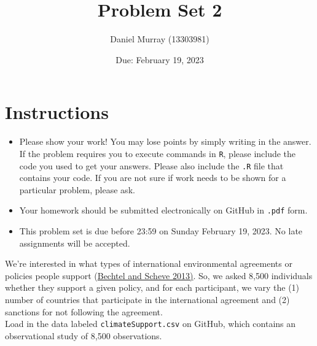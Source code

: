 \documentclass[12pt,letterpaper]{article}
\title{Problem Set 2}
\date{Due: February 19, 2023}
\author{Daniel Murray (13303981)}
\begin{document}
	\maketitle
	\section*{Instructions}
	\begin{itemize}
		\item Please show your work! You may lose points by simply writing in the answer. If the problem requires you to execute commands in \texttt{R}, please include the code you used to get your answers. Please also include the \texttt{.R} file that contains your code. If you are not sure if work needs to be shown for a particular problem, please ask.
		\item Your homework should be submitted electronically on GitHub in \texttt{.pdf} form.
		\item This problem set is due before 23:59 on Sunday February 19, 2023. No late assignments will be accepted.
	\end{itemize}

	
	

	\vspace{.25cm}
\noindent We're interested in what types of international environmental agreements or policies people support (\href{https://www.pnas.org/content/110/34/13763}{Bechtel and Scheve 2013)}. So, we asked 8,500 individuals whether they support a given policy, and for each participant, we vary the (1) number of countries that participate in the international agreement and (2) sanctions for not following the agreement. \\

\noindent Load in the data labeled \texttt{climateSupport.csv} on GitHub, which contains an observational study of 8,500 observations.
\end{document}
